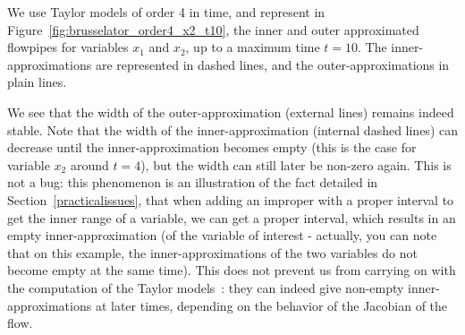\documentclass{sig-alternate-05-2015}
\begin{document}

 

We use Taylor models of order 4 in time, and represent  in Figure~\ref{fig:brusselator_order4_x2_t10}, the inner and outer approximated flowpipes for variables $x_1$ and $x_2$, up to a maximum time $t=10$. The inner-approximations are represented in dashed lines, and the outer-approximations in plain lines. 

 We see that the width of the outer-approximation 
(external lines) remains indeed stable. 
Note that the width of the inner-approximation (internal dashed lines) can decrease until the inner-approximation becomes empty 
(this is the case for variable $x_2$ around $t=4$), but the width can still later be non-zero again. 
This is not a bug: this phenomenon is an illustration of the fact detailed in Section~\ref{practicalissues}, that when adding an improper with a proper interval to get the inner range of a variable, we can get a proper interval, which results in an empty inner-approximation (of the variable of interest - actually, you can note that on this example, the inner-approximations of the two variables do not become empty at the same time). 
This does not prevent us from carrying
on with the computation of the Taylor models~:  they can indeed give non-empty inner-approximations at later times, 
depending on the behavior of the Jacobian of the flow.    
\end{document}
